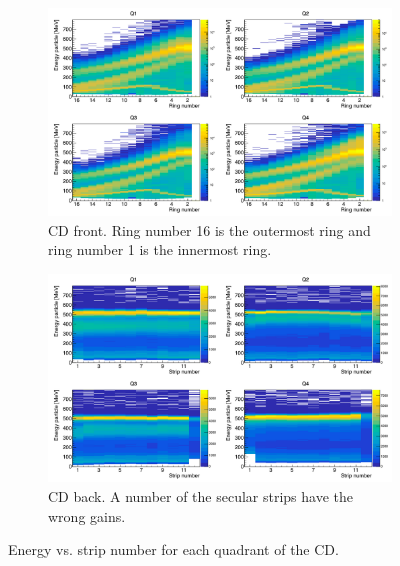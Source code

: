 \documentclass[twoside,english]{uiofysmaster/uiofysmaster}
\begin{document}
%
%
%

\begin{figure}[ht]
	\centering
	\begin{subfigure}{\textwidth}
		\centering
		\includegraphics[width=\textwidth]{../Plots/plotting/E_vs_f-strip_all_Q.png}
		\caption{CD front. Ring number 16 is the outermost ring and ring number 1 is the innermost ring.}
		\label{fig:cal_CD_front}
	\end{subfigure}
	\begin{subfigure}{\textwidth}
		\centering
		\includegraphics[width=\textwidth]{../Plots/plotting/E_vs_b-strip_all_Q.png}
		\caption{CD back. A number of the secular strips have the wrong gains.}
		\label{fig:cal_CD_back}
	\end{subfigure}
	\caption{Energy vs. strip number for each quadrant of the CD.}
	\label{fig:cal_CD}
\end{figure}
\end{document}
